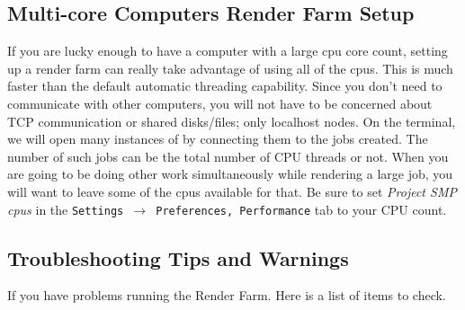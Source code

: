 \subsection{Multi-core Computers Render Farm Setup}%
\label{sub:multi_core_render_farm_setup}

If you are lucky enough to have a computer with a large cpu core
count, setting up a render farm can really take advantage of using
all of the cpus. This is much faster than the default automatic
threading capability. Since you don’t need to communicate with other
computers, you will not have to be concerned about TCP communication
or shared disks/files; only localhost nodes. On the terminal, we will open many instances of \CGG{} by connecting them to the jobs created. The number of such jobs can be the total number of CPU threads or not. When you are going to be doing other work
simultaneously while rendering a large job, you will want to leave
some of the cpus available for that.  Be sure to set \textit{Project SMP
cpus} in the \texttt{Settings $\rightarrow$ Preferences, Performance} tab to your CPU
count.

\subsection{Troubleshooting Tips and Warnings}%
\label{sub:troubleshhoting_tips_warnings}

\noindent If you have problems running the Render Farm.  Here is a
list of items to check.

